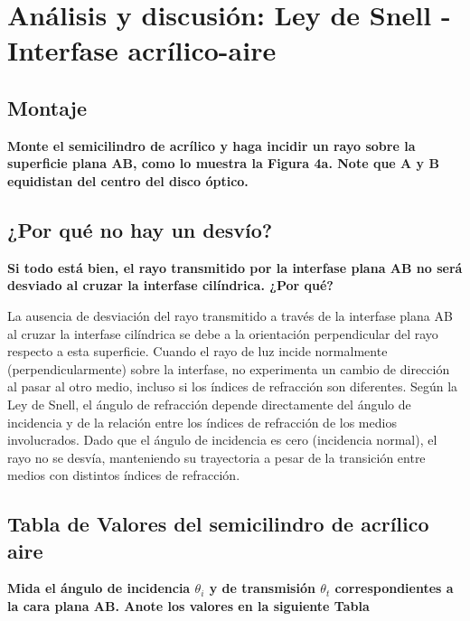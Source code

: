 \section{Análisis y discusión: Ley de Snell - Interfase acrílico-aire}
\subsection{Montaje}
\textbf{Monte el semicilindro de acrílico y haga incidir un rayo sobre la superficie plana AB,
como lo muestra la Figura 4a. Note que A y B equidistan del centro del disco óptico.}

\subsection{¿Por qué no hay un desvío?}
\textbf{Si todo está bien, el rayo transmitido por la interfase plana AB no será desviado al
cruzar la interfase cilíndrica. ¿Por qué?}

La ausencia de desviación del rayo transmitido a través de la interfase plana AB al cruzar la interfase cilíndrica se debe a la orientación perpendicular del rayo respecto a esta superficie. Cuando el rayo de luz incide normalmente (perpendicularmente) sobre la interfase, no experimenta un cambio de dirección al pasar al otro medio, incluso si los índices de refracción son diferentes. Según la Ley de Snell, el ángulo de refracción depende directamente del ángulo de incidencia y de la relación entre los índices de refracción de los medios involucrados. Dado que el ángulo de incidencia es cero (incidencia normal), el rayo no se desvía, manteniendo su trayectoria a pesar de la transición entre medios con distintos índices de refracción.

\subsection{Tabla de Valores del semicilindro de acrílico aire}
\textbf{Mida el ángulo de incidencia $\theta_{i}$ y de transmisión $\theta_{t}$ correspondientes a la cara
plana AB. Anote los valores en la siguiente Tabla}

